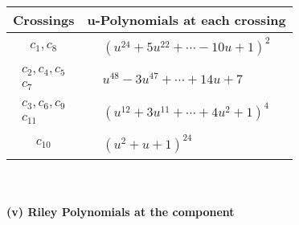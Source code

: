 \documentclass[1p]{elsarticle_modified}
\theoremstyle{definition}
\begin{document}
\begin{tabular}{m{50pt}|m{274pt}}
Crossings & \hspace{64pt}u-Polynomials at each crossing \\
\hline $$\begin{aligned}c_{1},c_{8}\end{aligned}$$&$\begin{aligned}
&(u^{24}+5 u^{22}+\cdots-10 u+1)^{2}
\end{aligned}$\\
\hline $$\begin{aligned}c_{2},c_{4},c_{5}\\c_{7}\end{aligned}$$&$\begin{aligned}
&u^{48}-3 u^{47}+\cdots+14 u+7
\end{aligned}$\\
\hline $$\begin{aligned}c_{3},c_{6},c_{9}\\c_{11}\end{aligned}$$&$\begin{aligned}
&(u^{12}+3 u^{11}+\cdots+4 u^2+1)^{4}
\end{aligned}$\\
\hline $$\begin{aligned}c_{10}\end{aligned}$$&$\begin{aligned}
&(u^2+u+1)^{24}
\end{aligned}$\\
\hline
\end{tabular}\\~\\
\newpage\renewcommand{\arraystretch}{1}
\flushleft \textbf{(v) Riley Polynomials at the component}\newline \\
\end{document}
